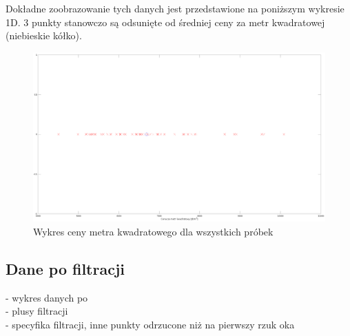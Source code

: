 Dokładne zoobrazowanie tych danych jest przedstawione na poniższym wykresie 1D. 3 punkty stanowczo są odsunięte od średniej ceny za metr kwadratowej (niebieskie kółko).


	\begin{figure}[H]
    \centering
    \includegraphics[scale=0.20]{PNG/1D.png}
    \caption{Wykres ceny metra kwadratowego dla wszystkich próbek}
    \label{lamana}
	\end{figure}
	

	\subsection{Dane po filtracji}
	- wykres danych po  \\
	- plusy filtracji \\
	- specyfika filtracji, inne punkty odrzucone niż na pierwszy rzuk oka \\